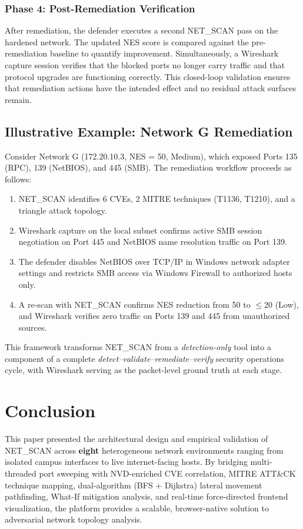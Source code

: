 \documentclass[conference]{IEEEtran}
\begin{document}
\subsubsection{Phase 4: Post-Remediation Verification}
After remediation, the defender executes a second NET\_SCAN pass on the hardened network. The updated NES score is compared against the pre-remediation baseline to quantify improvement. Simultaneously, a Wireshark capture session verifies that the blocked ports no longer carry traffic and that protocol upgrades are functioning correctly. This closed-loop validation ensures that remediation actions have the intended effect and no residual attack surfaces remain.

\subsection{Illustrative Example: Network G Remediation}
Consider Network G (172.20.10.3, NES = 50, Medium), which exposed Ports 135 (RPC), 139 (NetBIOS), and 445 (SMB). The remediation workflow proceeds as follows:
\begin{enumerate}
    \item NET\_SCAN identifies 6 CVEs, 2 MITRE techniques (T1136, T1210), and a triangle attack topology.
    \item Wireshark capture on the local subnet confirms active SMB session negotiation on Port 445 and NetBIOS name resolution traffic on Port 139.
    \item The defender disables NetBIOS over TCP/IP in Windows network adapter settings and restricts SMB access via Windows Firewall to authorized hosts only.
    \item A re-scan with NET\_SCAN confirms NES reduction from 50 to $\leq$20 (Low), and Wireshark verifies zero traffic on Ports 139 and 445 from unauthorized sources.
\end{enumerate}

This framework transforms NET\_SCAN from a \emph{detection-only} tool into a component of a complete \emph{detect--validate--remediate--verify} security operations cycle, with Wireshark serving as the packet-level ground truth at each stage.

\section{Conclusion}
This paper presented the architectural design and empirical validation of NET\_SCAN across \textbf{eight} heterogeneous network environments ranging from isolated campus interfaces to live internet-facing hosts. By bridging multi-threaded port sweeping with NVD-enriched CVE correlation, MITRE ATT\&CK technique mapping, dual-algorithm (BFS + Dijkstra) lateral movement pathfinding, What-If mitigation analysis, and real-time force-directed frontend visualization, the platform provides a scalable, browser-native solution to adversarial network topology analysis.
\end{document}

